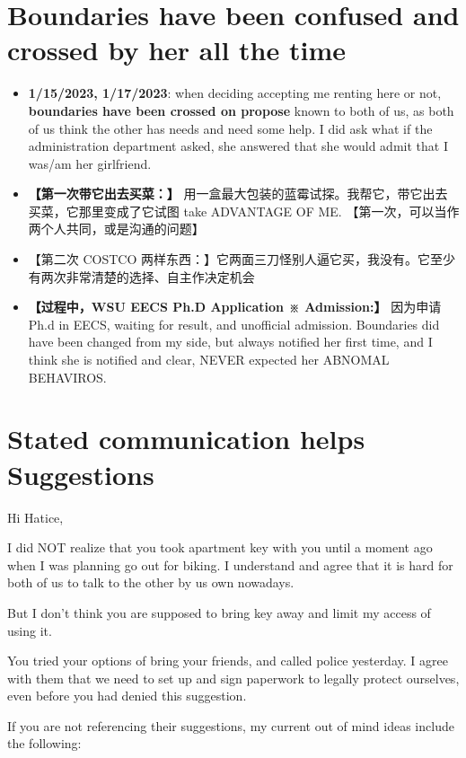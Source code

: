 \documentclass[9pt, b5paper]{article}
\begin{document}
\section{Boundaries have been confused and crossed by her all the time}
\label{sec-6}
\begin{itemize}
\item \textbf{1/15/2023, 1/17/2023}: when deciding accepting me renting here or not, \textbf{boundaries have been crossed on propose} known to both of us, as both of us think the other has needs and need some help. I did ask what if the administration department asked, she answered that she would admit that I was/am her girlfriend.
\item \textbf{【第一次带它出去买菜：】} 用一盒最大包装的蓝霉试探。我帮它，带它出去买菜，它那里变成了它试图 take ADVANTAGE OF ME. 【第一次，可以当作两个人共同，或是沟通的问题】
\item 【第二次 COSTCO 两样东西：】它两面三刀怪别人逼它买，我没有。它至少有两次非常清楚的选择、自主作决定机会
\item \textbf{【过程中，WSU EECS Ph.D Application ※ Admission:】} 因为申请Ph.d in EECS, waiting for result, and unofficial admission. Boundaries did have been changed from my side, but always notified her first time, and I think she is notified and clear, NEVER expected her ABNOMAL BEHAVIROS.
\end{itemize}

\section{Stated communication helps Suggestions}
\label{sec-7}
Hi Hatice, 

I did NOT realize that you took apartment key with you until a moment ago when I was planning go out for biking. I understand and agree that it is hard for both of us to talk to the other by us own nowadays. 

But I don't think you are supposed to bring key away and limit my access of using it. 

You tried your options of bring your friends, and called police yesterday. I agree with them that we need to set up and sign paperwork to legally protect ourselves, even before you had denied this suggestion. 

If you are not referencing their suggestions, my current out of mind ideas include the following: 
\end{document}

